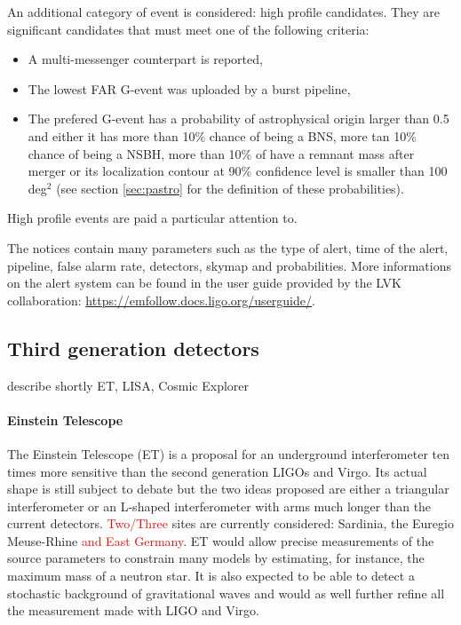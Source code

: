 An additional category of event is considered: high profile candidates.
They are significant candidates that must meet one of the following criteria:
\begin{itemize}
\item A multi-messenger counterpart is reported,
\item The lowest FAR G-event was uploaded by a burst pipeline,
\item The prefered G-event has a probability of astrophysical origin larger than 0.5 and either it has more than 10\% chance of being a BNS, more tan 10\% chance of being a NSBH, more than 10\% of have a remnant mass after merger or its localization contour at 90\% confidence level is smaller than 100 deg$^2$ (see section \ref{sec:pastro} for the definition of these probabilities).
\end{itemize}
High profile events are paid a particular attention to.

The notices contain many parameters such as the type of alert, time of the alert, pipeline, false alarm rate, detectors, skymap and probabilities.
More informations on the alert system can be found in the user guide provided by the LVK collaboration: \url{https://emfollow.docs.ligo.org/userguide/}.

\clearpage\newpage
\subsection{Third generation detectors}
describe shortly ET, LISA, Cosmic Explorer

\paragraph*{Einstein Telescope}
The Einstein Telescope (ET) \cite{ET} is a proposal for an underground interferometer ten times more sensitive than the second generation LIGOs and Virgo.
Its actual shape is still subject to debate but the two ideas proposed are either a triangular interferometer or an L-shaped interferometer with arms much longer than the current detectors.
\textcolor{red}{Two/Three} sites are currently considered: Sardinia, the Euregio Meuse-Rhine \textcolor{red}{and East Germany}.
ET would allow precise measurements of the source parameters to constrain many models by estimating, for instance, the maximum mass of a neutron star.
It is also expected to be able to detect a stochastic background of gravitational waves and would as well further refine all the measurement made with LIGO and Virgo.

